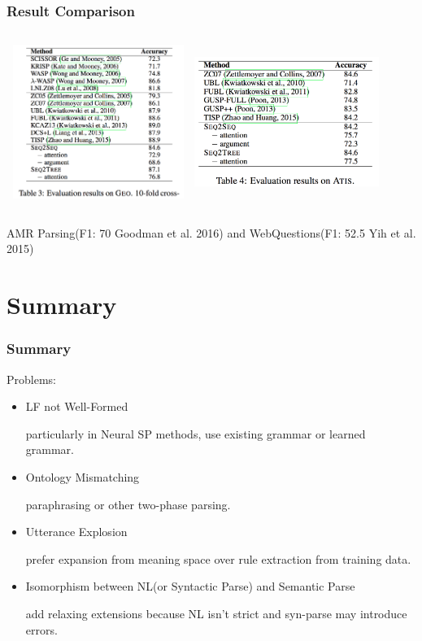 \documentclass{beamer}
\begin{document}
\begin{frame}
    \frametitle{Result Comparison}
    \begin{columns}
        \includegraphics[width=6cm,height=5cm]{img/result-geoquery.png}
        \includegraphics[width=6cm,height=5cm]{img/result-atis.png}
    \end{columns}

    \vspace*{\baselineskip}

    AMR Parsing(F1: 70 Goodman et al. 2016) and WebQuestions(F1: 52.5 Yih et al. 2015)
\end{frame}

\section{Summary}
\begin{frame}
    \frametitle{Summary}
    Problems:
    \begin{itemize}
        \item LF not Well-Formed

            particularly in Neural SP methods, use existing grammar or learned grammar.

        \item Ontology Mismatching

            paraphrasing or other two-phase parsing.

        \item Utterance Explosion

            prefer expansion from meaning space over rule extraction from training data.

        \item Isomorphism between NL(or Syntactic Parse) and Semantic Parse

            add relaxing extensions because NL isn't strict and syn-parse may introduce errors.

    \end{itemize}
\end{frame}
\end{document}
